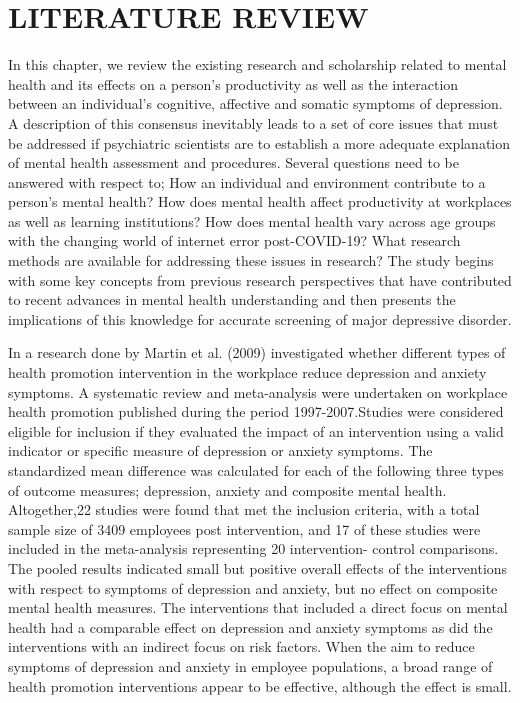 \documentclass[12pt]{article}
\begin{document}
\section{LITERATURE REVIEW}
In this chapter, we review the existing research and scholarship related to mental health and its effects on a person’s productivity as well as the interaction between an individual’s cognitive, affective and somatic symptoms of depression. A description of this consensus inevitably leads to a set of core issues that must be addressed if psychiatric scientists are to establish a more adequate explanation of mental health assessment and procedures. Several questions need to be answered with respect to; How an individual and environment contribute to a person’s mental health? How does mental health affect productivity at workplaces as well as learning institutions? How does mental health vary across age groups with the changing world of internet error post-COVID-19? What research methods are available for addressing these issues in research? The study begins with some key concepts from previous research perspectives that have contributed to recent advances in mental health understanding and then presents the implications of this knowledge for accurate screening of major depressive disorder.

In a research done by Martin et al. (2009) investigated whether different types of health promotion intervention in the workplace reduce depression and anxiety symptoms. A systematic review and meta-analysis were undertaken on workplace health promotion published during the period 1997-2007.Studies were considered eligible for inclusion if they evaluated the impact of an intervention using a valid indicator or specific measure of depression or anxiety symptoms. The standardized mean difference was calculated for each of the following three types of outcome measures; depression, anxiety and composite mental health. Altogether,22 studies were found that met the inclusion criteria, with a total sample size of 3409 employees post intervention, and 17 of these studies were included in the meta-analysis representing 20 intervention- control comparisons. The pooled results indicated small but positive overall effects of the interventions with respect to symptoms of depression and anxiety, but no effect on composite mental health measures. The interventions that included a direct focus on mental health had a comparable effect on depression and anxiety symptoms as did the interventions with an indirect focus on risk factors. When the aim to reduce symptoms of depression and anxiety in employee populations, a broad range of health promotion interventions appear to be effective, although the effect is small.\\
\end{document}
